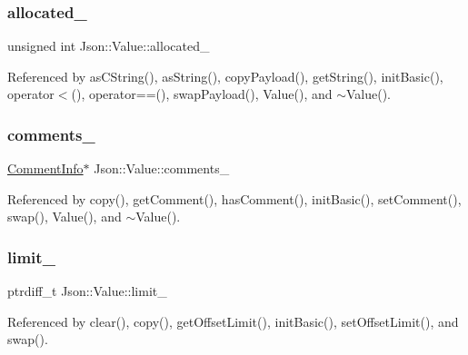 \subsubsection{\texorpdfstring{allocated\+\_\+}{allocated\_}}
{\footnotesize\ttfamily unsigned int Json\+::\+Value\+::allocated\+\_\+\hspace{0.3cm}{\ttfamily [private]}}



Referenced by as\+C\+String(), as\+String(), copy\+Payload(), get\+String(), init\+Basic(), operator$<$(), operator==(), swap\+Payload(), Value(), and $\sim$\+Value().

\mbox{\label{classJson_1_1Value_a2016564cabc7a29208e97bd0b782a4e4_a2016564cabc7a29208e97bd0b782a4e4}} 
\subsubsection{\texorpdfstring{comments\+\_\+}{comments\_}}
{\footnotesize\ttfamily \hyperlink{structJson_1_1Value_1_1CommentInfo}{Comment\+Info}$\ast$ Json\+::\+Value\+::comments\+\_\+\hspace{0.3cm}{\ttfamily [private]}}



Referenced by copy(), get\+Comment(), has\+Comment(), init\+Basic(), set\+Comment(), swap(), Value(), and $\sim$\+Value().

\mbox{\label{classJson_1_1Value_afe377e25f6d3b5b8ea7221c84f29412a_afe377e25f6d3b5b8ea7221c84f29412a}} 
\subsubsection{\texorpdfstring{limit\+\_\+}{limit\_}}
{\footnotesize\ttfamily ptrdiff\+\_\+t Json\+::\+Value\+::limit\+\_\+\hspace{0.3cm}{\ttfamily [private]}}



Referenced by clear(), copy(), get\+Offset\+Limit(), init\+Basic(), set\+Offset\+Limit(), and swap().


